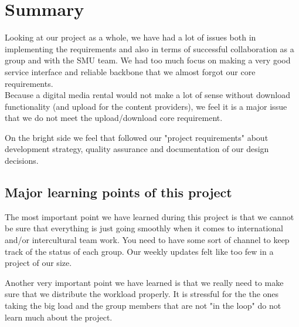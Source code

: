 \section{Summary}
Looking at our project as a whole, we have had a lot of issues both in implementing the requirements and also in terms of successful collaboration as a group and with the SMU team. We had too much focus on making a very good service interface and reliable backbone that we almost forgot our core requirements. 
\\Because a digital media rental would not make a lot of sense without download functionality (and upload for the content providers), we feel it is a major issue that we do not meet the upload/download core requirement. 

On the bright side we feel that followed our "project requirements" about development strategy, quality assurance and documentation of our design decisions.
\subsection{Major learning points of this project}
The most important point we have learned during this project is that we cannot be sure that everything is just going smoothly when it comes to international and/or intercultural team work. You need to have some sort of channel to keep track of the status of each group. Our weekly updates felt like too few in a project of our size.

Another very important point we have learned is that we really need to make sure that we distribute the workload properly. It is stressful for the the ones taking the big load and the group members that are not "in the loop" do not learn much about the project.
